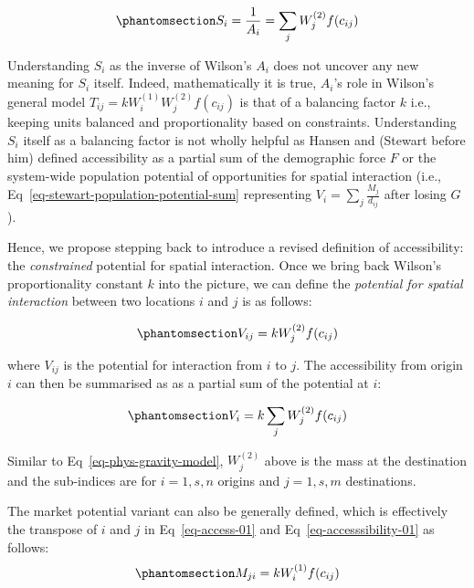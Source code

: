 \documentclass[
  10pt,
  letterpaper,
]{article}
\begin{document}
\begin{equation}\phantomsection\label{eq-Ai-as-accessibility}{
S_i = \frac{1}{A_i} = \sum_j W_j^{(2)} f(c_{ij})
}\end{equation}

Understanding \(S_i\) as the inverse of Wilson's \(A_i\) does not
uncover any new meaning for \(S_i\) itself. Indeed, mathematically it is
true, \(A_i\)'s role in Wilson's general model
\(T_{ij} = k W_i^{(1)} W_j^{(2)} f(c_{ij})\) is that of a balancing
factor \(k\) i.e., keeping units balanced and proportionality based on
constraints. Understanding \(S_i\) itself as a balancing factor is not
wholly helpful as Hansen and (Stewart before him) defined accessibility
as a partial sum of the demographic force \(F\) or the system-wide
population potential of opportunities for spatial interaction (i.e.,
Eq~\ref{eq-stewart-population-potential-sum} representing
\(V_i = \sum_j \frac{M_j}{d_{ij}}\) after losing \(G\)).

Hence, we propose stepping back to introduce a revised definition of
accessibility: the \emph{constrained} potential for spatial interaction.
Once we bring back Wilson's proportionality constant \(k\) into the
picture, we can define the \emph{potential for spatial interaction}
between two locations \(i\) and \(j\) is as follows:

\begin{equation}\phantomsection\label{eq-access-01}{
V_{ij} = k W_j^{(2)} f(c_{ij})
}\end{equation}

\noindent where \(V_{ij}\) is the potential for interaction from \(i\)
to \(j\). The accessibility from origin \(i\) can then be summarised as
as a partial sum of the potential at \(i\):

\begin{equation}\phantomsection\label{eq-accesssibility-01}{
V_{i} = k \sum_j W_j^{(2)} f(c_{ij})
}\end{equation}

Similar to Eq~\ref{eq-phys-gravity-model}, \(W_j^{(2)}\) above is the
mass at the destination and the sub-indices are for \(i = 1,s, n\)
origins and \(j = 1,s, m\) destinations.

The market potential variant can also be generally defined, which is
effectively the transpose of \(i\) and \(j\) in Eq~\ref{eq-access-01}
and Eq~\ref{eq-accesssibility-01} as follows:
\begin{equation}\phantomsection\label{eq-market-01}{
M_{ji} = k W_i^{(1)} f(c_{ij})
}\end{equation}
\end{document}
